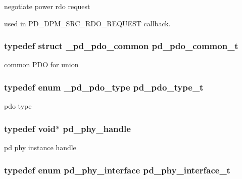 negotiate power rdo request 

used in P\-D\-\_\-\-D\-P\-M\-\_\-\-S\-R\-C\-\_\-\-R\-D\-O\-\_\-\-R\-E\-Q\-U\-E\-S\-T callback. \hypertarget{group__usb__pd__stack_ga7b2f5a42b9f5ae0e5b76f2ed44482ff3}{
\subsubsection[{pd\-\_\-pdo\-\_\-common\-\_\-t}]{\setlength{\rightskip}{0pt plus 5cm}typedef struct {\bf \-\_\-pd\-\_\-pdo\-\_\-common}  {\bf pd\-\_\-pdo\-\_\-common\-\_\-t}}}\label{group__usb__pd__stack_ga7b2f5a42b9f5ae0e5b76f2ed44482ff3}


common P\-D\-O for union 

\hypertarget{group__usb__pd__stack_ga1ed8c8629c16f0246f723f164abfe7d4}{
\subsubsection[{pd\-\_\-pdo\-\_\-type\-\_\-t}]{\setlength{\rightskip}{0pt plus 5cm}typedef enum {\bf \-\_\-pd\-\_\-pdo\-\_\-type}  {\bf pd\-\_\-pdo\-\_\-type\-\_\-t}}}\label{group__usb__pd__stack_ga1ed8c8629c16f0246f723f164abfe7d4}


pdo type 

\hypertarget{group__usb__pd__stack_gab39e13c5c0808b2fe22b7dac49db335a}{
\subsubsection[{pd\-\_\-phy\-\_\-handle}]{\setlength{\rightskip}{0pt plus 5cm}typedef void$\ast$ {\bf pd\-\_\-phy\-\_\-handle}}}\label{group__usb__pd__stack_gab39e13c5c0808b2fe22b7dac49db335a}


pd phy instance handle 

\hypertarget{group__usb__pd__stack_ga0499cb1eb2ad70e8d155ff72b50c7a38}{
\subsubsection[{pd\-\_\-phy\-\_\-interface\-\_\-t}]{\setlength{\rightskip}{0pt plus 5cm}typedef enum {\bf pd\-\_\-phy\-\_\-interface}  {\bf pd\-\_\-phy\-\_\-interface\-\_\-t}}}\label{group__usb__pd__stack_ga0499cb1eb2ad70e8d155ff72b50c7a38}


